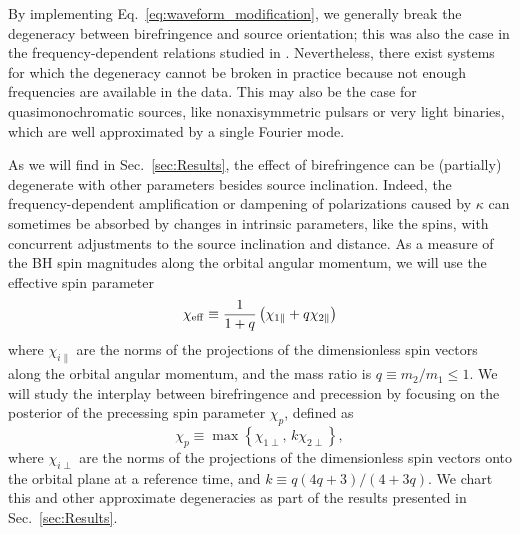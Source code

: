 \documentclass[aps,prd,twocolumn,superscriptaddress,preprintnumbers,nofootinbib]{revtex4-2}
\begin{document}
By implementing Eq.~\eqref{eq:waveform_modification}, we generally break the degeneracy between birefringence and source orientation; this was also the case in the frequency-dependent relations studied in \cite{Yamada_2020,Wang_2021}.
Nevertheless, there exist systems for which the degeneracy cannot be broken in practice because not enough frequencies are available in the data.
This may also be the case for quasimonochromatic sources, like nonaxisymmetric pulsars or very light binaries, which are well approximated by a single Fourier mode.

As we will find in Sec.~\ref{sec:Results}, the effect of birefringence can be (partially) degenerate with other parameters besides source inclination.
Indeed, the frequency-dependent amplification or dampening of polarizations caused by $\kappa$ can sometimes be absorbed by changes in intrinsic parameters, like the spins, with concurrent adjustments to the source inclination and distance.
As a measure of the \ac{BH} spin magnitudes along the orbital angular momentum, we will use the effective spin parameter \cite{Damour:2001tu,Ajith:2009bn,Santamaria:2010yb}
\begin{equation}
\chi_{\rm eff} \equiv \frac{1}{1+q} \left(\chi_{1\parallel} + q\chi_{2\parallel}\right)
\end{equation}
where $\chi_{i\parallel}$ are the norms of the projections of the dimensionless spin vectors along the orbital angular momentum, and the mass ratio is $q \equiv m_2/m_1 \leq 1$.
We will study the interplay between birefringence and precession by focusing on the posterior of the precessing spin parameter $\chi_p$, defined as \cite{Schmidt:2014iyl}
\begin{equation}
\chi_p \equiv \max\left\{ \chi_{1\perp},\, k \chi_{2\perp}\right\} ,
\end{equation}
where $\chi_{i\perp}$ are the norms of the projections of the dimensionless spin vectors onto the orbital plane at a reference time, and $k \equiv q\left(4 q +3\right) / \left(4 + 3q\right)$.
We chart this and other approximate degeneracies as part of the results presented in Sec.~\ref{sec:Results}.

\end{document}
